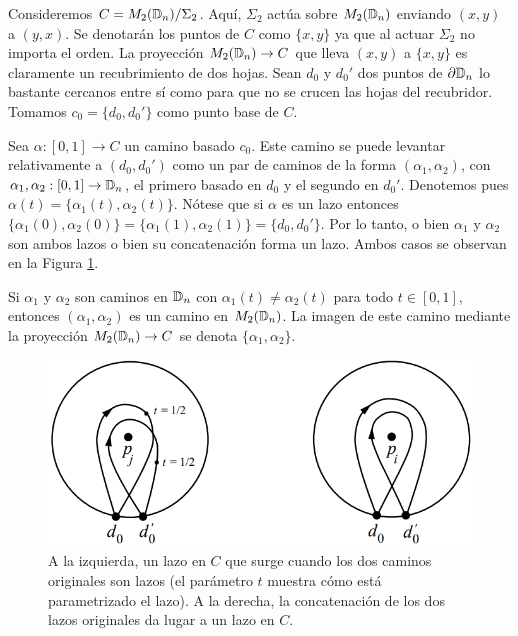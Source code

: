 \documentclass[TFG.tex]{subfiles}
\begin{document}
Consideremos $C=M_2(\mathbb{D}_n)/\Sigma_2$. Aquí, $\Sigma_2$ actúa sobre $M_2(\mathbb{D}_n)$ enviando $(x,y)$ a $(y,x)$. Se denotarán los puntos de $C$ como $\{x,y\}$ ya que al actuar $\Sigma_2$ no importa el orden. La proyección $M_2(\mathbb{D}_n)\to C$ que lleva $(x,y)$ a $\{x,y\}$ es claramente un recubrimiento de dos hojas. Sean $d_0$ y $d_0'$ dos puntos de $\partial\mathbb{D}_n$ lo bastante cercanos entre sí como para que no se crucen las hojas del recubridor. Tomamos $c_0=\{d_0,d_0'\}$ como punto base de $C$.


Sea $\alpha:[0,1]\to C$ un camino basado $c_0$. Este camino se puede levantar relativamente a $(d_0,d_0')$ como un par de caminos de la forma $(\alpha_1,\alpha_2)$, con $\alpha_1,\alpha_2:[0,1]\to\mathbb{D}_n$, el primero basado en $d_0$ y el segundo en $d_0'$. Denotemos pues $\alpha(t)=\{\alpha_1(t),\alpha_2(t)\}$. Nótese que si $\alpha$ es un lazo entonces $\{\alpha_1(0),\alpha_2(0)\}=\{\alpha_1(1),\alpha_2(1)\}=\{d_0,d_0'\}$. Por lo tanto, o bien $\alpha_1$ y $\alpha_2$ son ambos lazos o bien su concatenación forma un lazo. Ambos casos se observan en la Figura \ref{loop}. 




Si $\alpha_1$ y $\alpha_2$ son caminos en $\mathbb{D}_n$ con $\alpha_1(t)\neq\alpha_2(t)$ para todo $t\in[0,1]$, entonces $(\alpha_1,\alpha_2)$ es un camino en $M_2(\mathbb{D}_n)$. La imagen de este camino mediante la proyección $M_2(\mathbb{D}_n)\to C$ se denota $\{\alpha_1,\alpha_2\}$.

\begin{figure}[h!]
\includegraphics[scale=0.55]{Imagenes/loop}
\caption{A la izquierda, un lazo en $C$ que surge cuando los dos caminos originales son lazos (el parámetro $t$ muestra cómo está parametrizado el lazo). A la derecha, la concatenación de los dos lazos originales da lugar a un lazo en $C$.}\label{loop}
\end{figure}\ %
\end{document}
